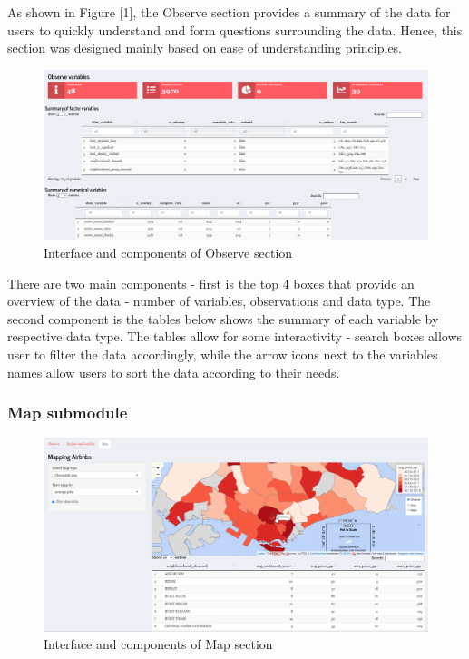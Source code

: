 \documentclass{acm_proc_article-sp}
\begin{document}
As shown in Figure {[}1{]}, the Observe section provides a summary of
the data for users to quickly understand and form questions surrounding
the data. Hence, this section was designed mainly based on ease of
understanding principles.

\begin{figure}[H]

{\centering \includegraphics[width=1\linewidth]{images/design_observe} 

}

\caption{Interface and components of Observe section}\label{fig:unnamed-chunk-1}
\end{figure}

There are two main components - first is the top 4 boxes that provide an
overview of the data - number of variables, observations and data type.
The second component is the tables below shows the summary of each
variable by respective data type. The tables allow for some
interactivity - search boxes allows user to filter the data accordingly,
while the arrow icons next to the variables names allow users to sort
the data according to their needs.

\hypertarget{map-submodule}{%
\subsubsection{Map submodule}\label{map-submodule}}

\begin{figure}[H]

{\centering \includegraphics[width=1\linewidth]{images/design_map} 

}

\caption{Interface and components of Map section}\label{fig:unnamed-chunk-2}
\end{figure}
\end{document}
